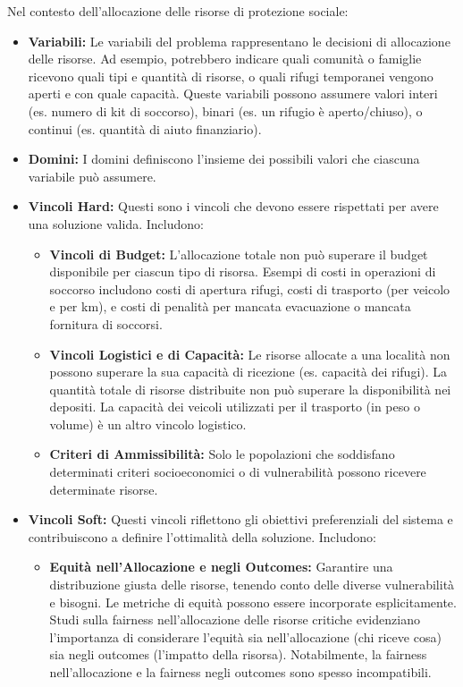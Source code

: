 \documentclass{article}
\begin{document}
Nel contesto dell'allocazione delle risorse di protezione sociale:
\begin{itemize}
    \item \textbf{Variabili:} Le variabili del problema rappresentano le decisioni di allocazione delle risorse. Ad esempio, potrebbero indicare quali comunità o famiglie ricevono quali tipi e quantità di risorse, o quali rifugi temporanei vengono aperti e con quale capacità. Queste variabili possono assumere valori interi (es. numero di kit di soccorso), binari (es. un rifugio è aperto/chiuso), o continui (es. quantità di aiuto finanziario).
    \item \textbf{Domini:} I domini definiscono l'insieme dei possibili valori che ciascuna variabile può assumere.
    \item \textbf{Vincoli Hard:} Questi sono i vincoli che devono essere rispettati per avere una soluzione valida. Includono:
    \begin{itemize}
        \item \textbf{Vincoli di Budget:} L'allocazione totale non può superare il budget disponibile per ciascun tipo di risorsa. Esempi di costi in operazioni di soccorso includono costi di apertura rifugi, costi di trasporto (per veicolo e per km), e costi di penalità per mancata evacuazione o mancata fornitura di soccorsi.
        \item \textbf{Vincoli Logistici e di Capacità:} Le risorse allocate a una località non possono superare la sua capacità di ricezione (es. capacità dei rifugi). La quantità totale di risorse distribuite non può superare la disponibilità nei depositi. La capacità dei veicoli utilizzati per il trasporto (in peso o volume) è un altro vincolo logistico.
        \item \textbf{Criteri di Ammissibilità:} Solo le popolazioni che soddisfano determinati criteri socioeconomici o di vulnerabilità possono ricevere determinate risorse.
    \end{itemize}
    \item \textbf{Vincoli Soft:} Questi vincoli riflettono gli obiettivi preferenziali del sistema e contribuiscono a definire l'ottimalità della soluzione. Includono:
    \begin{itemize}
        \item \textbf{Equità nell'Allocazione e negli Outcomes:} Garantire una distribuzione giusta delle risorse, tenendo conto delle diverse vulnerabilità e bisogni. Le metriche di equità possono essere incorporate esplicitamente. Studi sulla fairness nell'allocazione delle risorse critiche evidenziano l'importanza di considerare l'equità sia nell'allocazione (chi riceve cosa) sia negli outcomes (l'impatto della risorsa). Notabilmente, la fairness nell'allocazione e la fairness negli outcomes sono spesso incompatibili.

\end{itemize}
\end{itemize}
\end{document}
